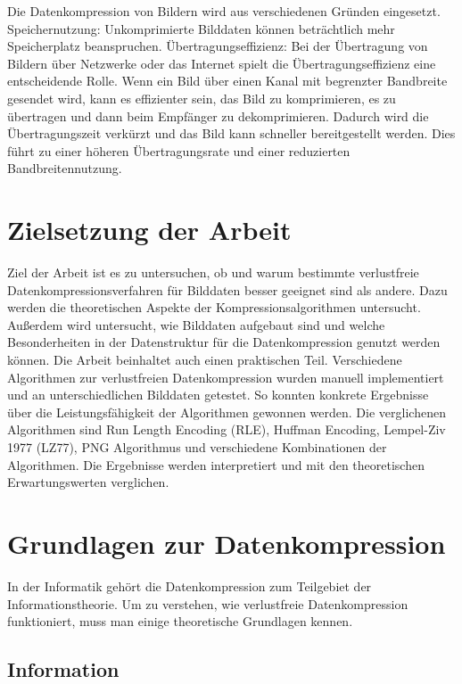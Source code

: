 \documentclass[conference]{IEEEtran}
\begin{document}
Die Datenkompression von Bildern wird aus verschiedenen Gründen eingesetzt.
Speichernutzung: Unkomprimierte Bilddaten können beträchtlich mehr Speicherplatz beanspruchen.
Übertragungseffizienz: Bei der Übertragung von Bildern über Netzwerke oder das Internet spielt
die Übertragungseffizienz eine entscheidende Rolle.
Wenn ein Bild über einen Kanal mit begrenzter Bandbreite gesendet wird, kann es effizienter
sein, das Bild zu komprimieren, es zu übertragen und dann beim Empfänger zu dekomprimieren.
Dadurch wird die Übertragungszeit verkürzt und das Bild kann schneller bereitgestellt werden.
Dies führt zu einer höheren Übertragungsrate und einer reduzierten Bandbreitennutzung.



\section{Zielsetzung der Arbeit}

Ziel der Arbeit ist es zu untersuchen, ob und warum bestimmte verlustfreie
Datenkompressionsverfahren für Bilddaten besser geeignet sind als andere.
Dazu werden die theoretischen Aspekte der Kompressionsalgorithmen untersucht.
Außerdem wird untersucht, wie Bilddaten aufgebaut sind und welche Besonderheiten
in der Datenstruktur für die Datenkompression genutzt werden können.
Die Arbeit beinhaltet auch einen praktischen Teil.
Verschiedene Algorithmen zur verlustfreien Datenkompression wurden manuell
implementiert und an unterschiedlichen Bilddaten getestet.
So konnten konkrete Ergebnisse über die Leistungsfähigkeit der Algorithmen gewonnen werden.
Die verglichenen Algorithmen sind Run Length Encoding (RLE), Huffman Encoding, Lempel-Ziv 1977 (LZ77),
PNG Algorithmus und verschiedene Kombinationen der Algorithmen.
Die Ergebnisse werden interpretiert und mit den theoretischen Erwartungswerten verglichen.


\section{Grundlagen zur Datenkompression}

In der Informatik gehört die Datenkompression zum Teilgebiet der Informationstheorie.
Um zu verstehen, wie verlustfreie Datenkompression funktioniert, muss man einige theoretische
Grundlagen kennen.

\subsection{Information}
\end{document}
